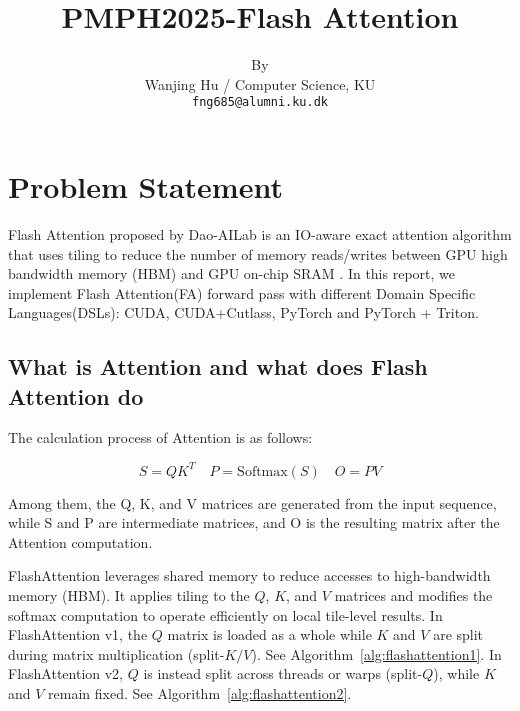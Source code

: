 \documentclass[11pt]{article}
\title{PMPH2025-Flash Attention}
\author{By \\
  Wanjing Hu / Computer Science, KU  \\
  \texttt{fng685@alumni.ku.dk} \\}
\renewcommand\cite{\citep}  %
\begin{document}
\maketitle

\section{Problem Statement}

Flash Attention proposed by Dao-AILab is an IO-aware exact attention algorithm that uses tiling to reduce the number of memory reads/writes between GPU high bandwidth memory (HBM) and GPU on-chip SRAM\cite{dao2022flashattention} \cite{dao2023flashattention}. In this report, we implement Flash Attention(FA) forward pass with different Domain Specific Languages(DSLs): CUDA, CUDA+Cutlass, PyTorch and PyTorch + Triton.

\subsection{What is Attention and what does Flash Attention do}
The calculation process of Attention is as follows:

\[
S = QK^{T} \quad P = \text{Softmax}(S) \quad O = PV
\]

Among them, the Q, K, and V matrices are generated from the input sequence, while S and P are intermediate matrices, and O is the resulting matrix after the Attention computation.

FlashAttention leverages shared memory to reduce accesses to high-bandwidth memory (HBM). It applies tiling to the $Q$, $K$, and $V$ matrices and modifies the softmax computation to operate efficiently on local tile-level results. In FlashAttention v1, the $Q$ matrix is loaded as a whole while $K$ and $V$ are split  during matrix multiplication (split-$K/V$). See Algorithm~\ref{alg:flashattention1}. In FlashAttention v2, $Q$ is instead split across threads or warps (split-$Q$), while $K$ and $V$ remain fixed. See Algorithm~\ref{alg:flashattention2}.
\end{document}

